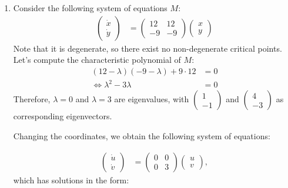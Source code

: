 \documentclass[12pt,letterpaper]{article}
\begin{document}
\begin{enumerate}[label=(\alph*)]
	\item Consider the following system of equations $M$:
	      \begin{align}
		      \begin{pmatrix}
			      \dot{x} \\
			      \dot{y}
		      \end{pmatrix} & = \begin{pmatrix}
			      12 & 12 \\
			      -9 & -9
		      \end{pmatrix}
		      \begin{pmatrix}
			      x \\
			      y
		      \end{pmatrix}
	      \end{align}
	      Note that it is degenerate, so there exist no non-degenerate critical points.
	      Let's compute the characteristic polynomial of $M$:
	      \begin{align}
		      (12 - \lambda)(-9 -  \lambda) + 9 \cdot 12 & =0  \\
		      \Leftrightarrow \lambda ^2 -3\lambda       & = 0
	      \end{align}
	      Therefore, $\lambda = 0$ and $\lambda =3$ are eigenvalues, with $\begin{pmatrix}
			      1  \\
			      -1
		      \end{pmatrix}$ and $\begin{pmatrix}
			      4  \\
			      -3
		      \end{pmatrix}$ as corresponding eigenvectors.

	      Changing the coordinates, we obtain the following system of equations:

	      \begin{align}
		      \begin{pmatrix}
			      \dot{u} \\
			      \dot{v}
		      \end{pmatrix} & = \begin{pmatrix}
			      0 & 0 \\
			      0 & 3
		      \end{pmatrix}\begin{pmatrix}
			      u \\
			      v
		      \end{pmatrix},
	      \end{align}
	      which has solutions in the form:


\end{enumerate}
\end{document}
